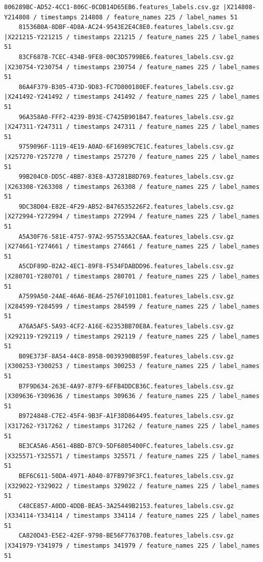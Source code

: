 \documentclass{UoNMCHA}
\numberwithin{equation}{section}
\begin{document}
\begin{lstlisting}[breaklines=true]
    806289BC-AD52-4CC1-806C-0CDB14D65EB6.features_labels.csv.gz |X214808-Y214808 / timestamps 214808 / feature_names 225 / label_names 51
    81536B0A-8DBF-4D8A-AC24-9543E2E4C8E0.features_labels.csv.gz |X221215-Y221215 / timestamps 221215 / feature_names 225 / label_names 51
    83CF687B-7CEC-434B-9FE8-00C3D5799BE6.features_labels.csv.gz |X230754-Y230754 / timestamps 230754 / feature_names 225 / label_names 51
    86A4F379-B305-473D-9D83-FC7D800180EF.features_labels.csv.gz |X241492-Y241492 / timestamps 241492 / feature_names 225 / label_names 51
    96A358A0-FFF2-4239-B93E-C7425B901B47.features_labels.csv.gz |X247311-Y247311 / timestamps 247311 / feature_names 225 / label_names 51
    9759096F-1119-4E19-A0AD-6F16989C7E1C.features_labels.csv.gz |X257270-Y257270 / timestamps 257270 / feature_names 225 / label_names 51
    99B204C0-DD5C-4BB7-83E8-A37281B8D769.features_labels.csv.gz |X263308-Y263308 / timestamps 263308 / feature_names 225 / label_names 51
    9DC38D04-E82E-4F29-AB52-B476535226F2.features_labels.csv.gz |X272994-Y272994 / timestamps 272994 / feature_names 225 / label_names 51
    A5A30F76-581E-4757-97A2-957553A2C6AA.features_labels.csv.gz |X274661-Y274661 / timestamps 274661 / feature_names 225 / label_names 51
    A5CDF89D-02A2-4EC1-89F8-F534FDABDD96.features_labels.csv.gz |X280701-Y280701 / timestamps 280701 / feature_names 225 / label_names 51
    A7599A50-24AE-46A6-8EA6-2576F1011D81.features_labels.csv.gz |X284599-Y284599 / timestamps 284599 / feature_names 225 / label_names 51
    A76A5AF5-5A93-4CF2-A16E-62353BB70E8A.features_labels.csv.gz |X292119-Y292119 / timestamps 292119 / feature_names 225 / label_names 51
    B09E373F-8A54-44C8-895B-0039390B859F.features_labels.csv.gz |X300253-Y300253 / timestamps 300253 / feature_names 225 / label_names 51
    B7F9D634-263E-4A97-87F9-6FFB4DDCB36C.features_labels.csv.gz |X309636-Y309636 / timestamps 309636 / feature_names 225 / label_names 51
    B9724848-C7E2-45F4-9B3F-A1F38D864495.features_labels.csv.gz |X317262-Y317262 / timestamps 317262 / feature_names 225 / label_names 51
    BE3CA5A6-A561-4BBD-B7C9-5DF6805400FC.features_labels.csv.gz |X325571-Y325571 / timestamps 325571 / feature_names 225 / label_names 51
    BEF6C611-50DA-4971-A040-87FB979F3FC1.features_labels.csv.gz |X329022-Y329022 / timestamps 329022 / feature_names 225 / label_names 51
    C48CE857-A0DD-4DDB-BEA5-3A25449B2153.features_labels.csv.gz |X334114-Y334114 / timestamps 334114 / feature_names 225 / label_names 51
    CA820D43-E5E2-42EF-9798-BE56F776370B.features_labels.csv.gz |X341979-Y341979 / timestamps 341979 / feature_names 225 / label_names 51

\end{lstlisting}
\end{document}
